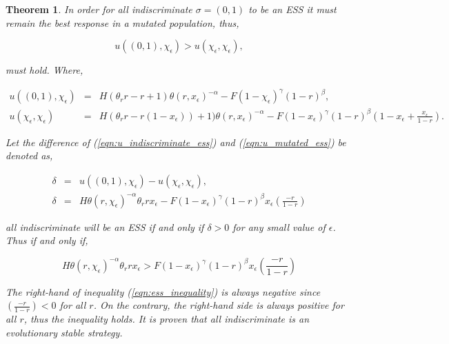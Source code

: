 \documentclass[10pt]{article}
\newtheorem{theorem}{Theorem}
\begin{document}
\begin{theorem}
	In order for all indiscriminate \(\sigma=(0,1)\) to be an ESS it must
	remain the best response in a mutated population, thus,

	\begin{equation}\label{eqn:evolutionary_stability}
		u((0, 1), \chi_\epsilon) > u(\chi_\epsilon, \chi_\epsilon),
	\end{equation}

	must hold. Where, 

	\begin{eqnarray}
		\label{eqn:u_indiscriminate_ess}
		u((0, 1), \chi_\epsilon)  &=& H(\theta_rr - r + 1)\theta(r, x_\epsilon) ^{-\alpha}
		- F(1 - \chi_\epsilon) ^ {\gamma} (1- r) ^ {\beta},
		\\
		\label{eqn:u_mutated_ess}
		u(\chi_\epsilon, \chi_\epsilon) &=& H(\theta_rr - r(1 - x_\epsilon))+ 1)\theta(r,
		x_\epsilon) ^{-\alpha} - F(1 - x_\epsilon) ^ {\gamma} (1- r) ^ {\beta}(1 - 
		x_\epsilon + \frac{x_\epsilon}{1- r}).
\end{eqnarray}

	Let the difference of (\ref{eqn:u_indiscriminate_ess}) and (\ref{eqn:u_mutated_ess})
	be denoted as, 

	\begin{eqnarray}
		\label{eqn:delta}
	 	\delta &=& u((0, 1), \chi_\epsilon) - u(\chi_\epsilon, \chi_\epsilon),
	 	\\
	 	\label{eqn:sub_to_delta}
	 	\delta &=& H\theta(r, \chi_\epsilon) ^{-\alpha} \theta_r r x_\epsilon -
	 	F(1 - x_\epsilon) ^ {\gamma} (1- r) ^ {\beta}x_\epsilon(\frac{-r}{1- r})
	\end{eqnarray}

	all indiscriminate will be an ESS if and only if \(\delta >0 \) for any small 
	value of \(\epsilon\). Thus if and only if,

	\begin{equation}
	\label{eqn:ess_inequality}
		H\theta(r, \chi_\epsilon) ^{-\alpha} \theta_r r x_\epsilon > F
	 	(1 - x_\epsilon) ^ {\gamma} (1- r) ^ {\beta} x_\epsilon(\frac{-r}{1- r})
	\end{equation}

	The right-hand of inequality (\ref{eqn:ess_inequality}) is always negative
	since \((\frac{-r}{1- r}) < 0\)  for all \(r\). On the contrary, the right-hand 
	side is always positive for all \(r\), thus the inequality holds. 
	It is proven that all indiscriminate is an evolutionary stable strategy.
\end{theorem}
\end{document}
